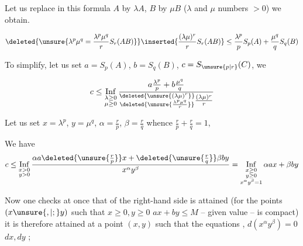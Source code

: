 
Let us replace in this formula $A$ by $\lambda A$, $B$ by $\mu B$ ($\lambda$ and $\mu$ numbers $>0$) we obtain.

\[
\deleted{\unsure{\lambda^p\mu^q=\frac{\lambda^p\mu^q}{r}S_r(AB)}}
\inserted{\frac{(\lambda\mu)^r}{r}S_r(AB)}
\leq\frac{\lambda^p}{p}S_p(A)+\frac{\mu^q}{q}S_q(B)
\]



To simplify, let us set $a=S_p(A)$, $b=S_q(B)$, $c=S_{\unsure{p|r}}(C)$, we 

\[
c\leq\mathop{\mathrm{Inf}}\limits_{\substack{\lambda\geq0\\\mu\geq0}}
\frac{a\frac{\lambda^p}{p}+b\frac{\mu^q}{q}}
{\substack{\deleted{\unsure{(\lambda\mu)^r}}\\\deleted{\unsure{\frac{\lambda^p\mu^q}{r}}}}\frac{(\lambda\mu)^r}{r}}
\]


Let us set $x=\lambda^p$, $y=\mu^q$, $\alpha=\frac rp$, $\beta=\frac rq$  whence \unsure{,} \uline{$\frac rp+\frac rq=1$},

We have
\[
c\leq\mathop{\mathrm{Inf}}\limits_{\substack{x>0\\y>0}}
\frac{\alpha a\deleted{\unsure{\frac rp}}x+\deleted{\unsure{\frac rq}}\beta by}{x^\alpha y^\beta}
=\mathop{\mathrm{Inf}}\limits_{\substack{x\geq0\\y\geq0\\x^\alpha y^\beta=1}}\alpha a x+\beta by
\]

Now one checks at once that   of the right-hand side is attained (for the   points $(x\unsure{,|;}y)$ such that $x\geq0,y\geq0$ $ax+by\leq M$ -- given value -- is compact) it is therefore attained at a point $(x,y)$ such that the equations , $d(x^\alpha y^\beta)=0$   $dx,dy$ ;

